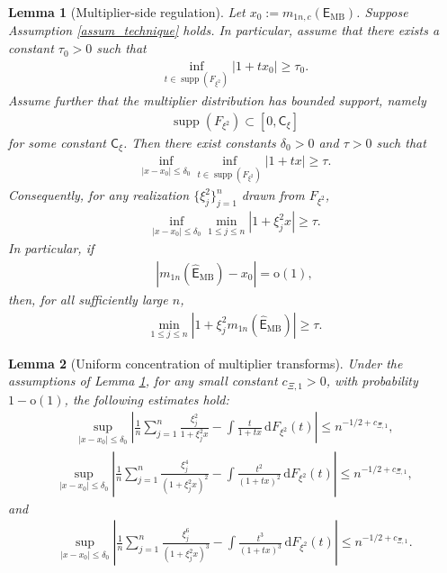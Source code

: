 \documentclass[10pt,a4paper]{amsart}
\newtheorem{lemma}{Lemma}
\begin{document}
\begin{lemma}[Multiplier-side regulation]\label{lem_regulation}
	Let $x_0:=m_{1n,c}(\mathsf{E}_{\mathrm{MB}})$. Suppose Assumption \ref{assum_technique} holds. In particular, assume that there exists a constant $\tau_0>0$ such that
	\begin{align*}
		\inf_{t\in \operatorname{supp}(F_{\xi^2})}
		|1+t x_0|\geq \tau_0 .
	\end{align*}
	Assume further that the multiplier distribution has bounded support, namely
	\begin{align*}
		\operatorname{supp}(F_{\xi^2})\subset [0,\mathsf{C}_\xi]
	\end{align*}
	for some constant $\mathsf{C}_\xi$. Then there exist constants $\delta_0>0$ and $\tau>0$ such that
	\begin{align*}
		\inf_{|x-x_0|\leq \delta_0}
		\inf_{t\in \operatorname{supp}(F_{\xi^2})}
		|1+tx|\geq \tau .
	\end{align*}
	Consequently, for any realization $\{\xi_j^2\}_{j=1}^n$ drawn from
	$F_{\xi^2}$,
	\begin{align*}
		\inf_{|x-x_0|\le \delta_0} \min_{1\leq j\leq n} |1+\xi_j^2x|\geq \tau.
	\end{align*}
	In particular, if
	\begin{align*}
		|m_{1n}(\widehat{\mathsf{E}}_{\mathrm{MB}})-x_0|=\mathrm{o}(1),
	\end{align*}
	then, for all sufficiently large $n$,
	\begin{align*}
		\min_{1\le j\le n}|1+\xi_j^2m_{1n}(\widehat{\mathsf{E}}_{\mathrm{MB}})|\geq \tau .
	\end{align*}
\end{lemma}

\begin{lemma}[Uniform concentration of multiplier transforms]
	\label{lem_uniform_multiplier_concentration}
	Under the assumptions of Lemma \ref{lem_regulation}, for any  small constant
	$c_{\Xi,1}>0$, with probability $1-\mathrm{o}(1)$, the following estimates hold:
	\begin{align*}
		\sup_{|x-x_0|\le\delta_0}\left|\frac{1}{n}\sum_{j=1}^n \frac{\xi_j^2}{1+\xi_j^2x}-\int\frac{t}{1+tx}\,\mathrm{d}F_{\xi^2}(t) \right|\leq n^{-1/2+c_{\Xi,1}},
	\end{align*}
	\begin{align*}
		\sup_{|x-x_0|\le\delta_0}\left|\frac{1}{n}\sum_{j=1}^n\frac{\xi_j^4}{(1+\xi_j^2x)^2}-\int\frac{t^2}{(1+tx)^2}\,\mathrm{d}F_{\xi^2}(t)\right|\leq n^{-1/2+c_{\Xi,1}},
	\end{align*}
	and
	\begin{align*}
		\sup_{|x-x_0|\le\delta_0}\left|\frac{1}{n}\sum_{j=1}^n \frac{\xi_j^6}{(1+\xi_j^2x)^3}-\int\frac{t^3}{(1+tx)^3}\,\mathrm{d}F_{\xi^2}(t)\right|\leq n^{-1/2+c_{\Xi,1}}.
	\end{align*}
\end{lemma}
\end{document}
